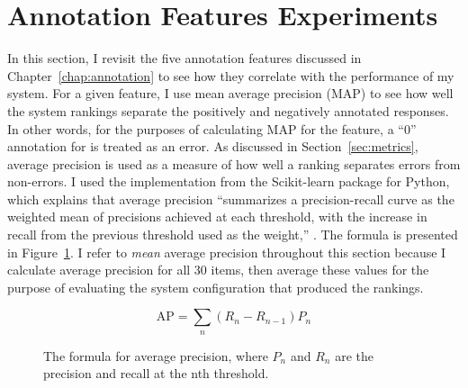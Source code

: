 \section{Annotation Features Experiments}
\label{sec:exp-annotations}
In this section, I revisit the five annotation features discussed in Chapter~\ref{chap:annotation} to see how they correlate with the performance of my system. For a given feature, I use mean average precision (MAP) to see how well the system rankings separate the positively and negatively annotated responses. In other words, for the purposes of  calculating MAP for the  feature, a ``0'' annotation for  is treated as an error. As discussed in Section~\ref{sec:metrics}, average precision is used as a measure of how well a ranking separates errors from non-errors. I used the  implementation from the Scikit-learn package for Python, which explains that average precision ``summarizes a precision-recall curve as the weighted mean of precisions achieved at each threshold, with the increase in recall from the previous threshold used as the weight,'' \cite{scikit-learn}. The formula is presented in Figure~\ref{fig:exp-ap}. I refer to \textit{mean} average precision throughout this section because I calculate average precision for all 30 items, then average these values for the purpose of evaluating the system configuration that produced the rankings.



\begin{figure}[htb!]
\begin{center}
\[
\text{AP} = {\sum_n (R_n - R_{n-1}) P_n}
\]
\caption{\label{fig:exp-ap} The formula for average precision, where $P_n$ and $R_n$ are the precision and recall at the nth threshold.}
\end{center}
\end{figure}




